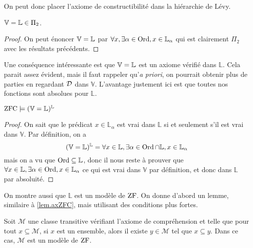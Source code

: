 On peut donc placer l'axiome de constructibilité dans la hiérarchie de Lévy.

\begin{proposition}
  $\mathbb V = \mathbb L \in \Pi_2$.
\end{proposition}

\begin{proof}
  On peut énoncer $\mathbb V = \mathbb L$ par
  $\forall x, \exists \alpha \in \operatorname{Ord}, x\in \mathbb L_\alpha$ qui est clairement
  $\Pi_2$ avec les résultats précédents.
\end{proof}

Une conséquence intéressante est que $\mathbb V = \mathbb L$ est un axiome vérifié dans
$\mathbb L$. Cela parait assez évident, mais il faut rappeler
qu'\textit{a priori}, on pourrait obtenir plus de parties en regardant
$\mathcal{D}$ dans $\mathbb V$. L'avantage justement ici est que toutes nos
fonctions sont absolues pour $\mathbb L$. 

\begin{theorem}
  $\operatorname{ZFC}\models (\mathbb V = \mathbb L)^{\mathbb L}$
\end{theorem}

\begin{proof}
  On sait que le prédicat $x\in \mathbb L_{\alpha}$ est vrai dans
  $\mathbb L$ si et seulement s'il est vrai dans $\mathbb V$. Par définition,
  on a
  \[(\mathbb V = \mathbb L)^{\mathbb L} =
  \forall x \in \mathbb L,\exists \alpha \in \operatorname{Ord}\cap \mathbb L,
  x\in \mathbb L_\alpha\]
  mais on a vu que $\operatorname{Ord}\subseteq \mathbb L$, donc il nous reste à prouver que
  $\forall x \in \mathbb L, \exists \alpha \in \operatorname{Ord}, x \in \mathbb L_\alpha$
  ce qui est vrai dans $\mathbb V$ par définition, et donc dans
  $\mathbb L$ par absoluité.
\end{proof}

On montre aussi que $\mathbb L$ est un modèle de $\operatorname{ZF}$. On donne d'abord un
lemme, similaire à \cref{lem.axZFC}, mais utilisant des conditions plus fortes.

\begin{lemma}\label{lem.axZFC2}
  Soit $\mathcal M$ une classe transitive vérifiant l'axiome de compréhension
  et telle que pour tout $x \subseteq \mathcal M$, si $x$ est un ensemble, alors
  il existe $y \in \mathcal M$ tel que $x \subseteq y$. Dans ce cas,
  $\mathcal M$ est un modèle de $\operatorname{ZF}$.
\end{lemma}

